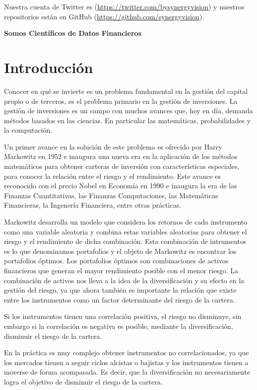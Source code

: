 \documentclass[
  12pt,
]{krantz}
\begin{document}
Nuestra cuenta de Twitter es (\url{https://twitter.com/bysynergyvision}) y nuestros repositorios están en GitHub (\url{https://github.com/synergyvision}).

\textbf{Somos Científicos de Datos Financieros}

\mainmatter

\hypertarget{introduccion}{%
\chapter{Introducción}\label{introduccion}}

Conocer en qué se invierte es un problema fundamental en la gestión del capital propio o de terceros, es el problema primario en la gestión de inversiones. La gestión de inversiones es un campo con muchos avances que, hoy en día, demanda métodos basados en las ciencias. En particular las matemáticas, probabilidades y la computación.

Un primer avance en la solución de este problema es ofrecido por Harry Markowitz en 1952 e inaugura una nueva era en la aplicación de los métodos matemáticos para obtener carteras de inversión con características especiales, para conocer la relación entre el riesgo y el rendimiento. Este avance es reconocido con el precio Nobel en Economía en 1990 e inaugura la era de las Finanzas Cuantitativas, las Finanzas Computaciones, las Matemáticas Financieras, la Ingenería Financiera, entre otras prácticas.

Markowitz desarrolla un modelo que considera los retornos de cada instrumento como una variable aleatoria y combina estas variables aleatorias para obtener el riesgo y el rendimiento de dicha combinación. Esta combinación de intrumentos es lo que denominamos portafolios y el objeto de Markowitz es encontrar los portafolios óptimos. Los portafolios óptimos son combinaciones de activos financieros que generan el mayor rendimiento posible con el menor riesgo. La combinación de activos nos lleva a la idea de la diversificación y su efecto en la gestión del riesgo, ya que ahora también es importante la relación que existe entre los instrumentos como un factor determinante del riesgo de la cartera.

Si los instrumentos tienen una correlación positiva, el riesgo no disminuye, sin embargo si la correlación es negativa es posible, mediante la diversificación, disminuir el riesgo de la cartera.

En la práctica es muy complejo obtener instrumentos no correlacionados, ya que los mercados tienen a seguir ciclos alcistas o bajistas y los instrumentos tienen a moverse de forma acompasada. Es decir, que la diversificación no necesariamente logra el objetivo de disminuir el riesgo de la cartera.
\end{document}
